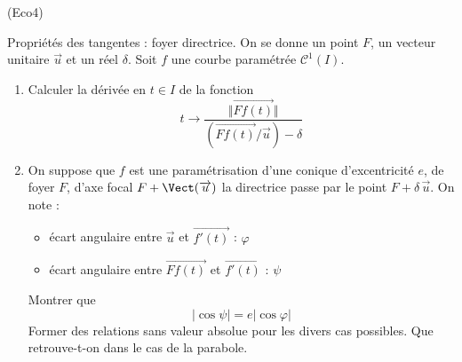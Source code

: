 \begin{tiny}(Eco4)\end{tiny} Propriétés des tangentes : foyer directrice.\newline
On se donne un point $F$, un vecteur unitaire $\overrightarrow u$ et un réel $\delta$. Soit $f$ une courbe paramétrée $\mathcal{C}^1(I)$.
\begin{enumerate}
 \item Calculer la dérivée en $t\in I$ de la fonction
\begin{displaymath}
 t \rightarrow \frac{\Vert \overrightarrow{Ff(t)}\Vert}{(\overrightarrow{Ff(t)}/\overrightarrow u) - \delta}
\end{displaymath}
\item On suppose que $f$ est une paramétrisation d'une conique d'excentricité $e$, de foyer $F$, d'axe focal $F+\Vect(\overrightarrow u)$ la directrice passe par le point $F+\delta\,\overrightarrow u$. On note :
\begin{itemize}
 \item écart angulaire entre $\overrightarrow u$ et $\overrightarrow{f'(t)}$ : $\varphi$
 \item écart angulaire entre $\overrightarrow{Ff(t)}$ et $\overrightarrow{f'(t)}$ : $\psi$
\end{itemize}
Montrer que 
\begin{displaymath}
 |\cos \psi | = e |\cos \varphi|
\end{displaymath}
Former des relations sans valeur absolue pour les divers cas possibles. Que retrouve-t-on dans le cas de la parabole.
\end{enumerate}
